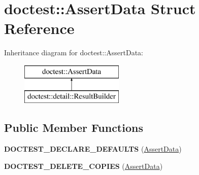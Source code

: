 \hypertarget{structdoctest_1_1_assert_data}{}\section{doctest\+::Assert\+Data Struct Reference}
\label{structdoctest_1_1_assert_data}
Inheritance diagram for doctest\+::Assert\+Data\+:\begin{figure}[H]
\begin{center}
\leavevmode
\includegraphics[height=2.000000cm]{structdoctest_1_1_assert_data}
\end{center}
\end{figure}
\subsection*{Public Member Functions}
\begin{DoxyCompactItemize}
\item 
\mbox{\label{structdoctest_1_1_assert_data_a8543eb3e9ac1c5c10b1becd8bfd0c2fa}} 
{\bfseries D\+O\+C\+T\+E\+S\+T\+\_\+\+D\+E\+C\+L\+A\+R\+E\+\_\+\+D\+E\+F\+A\+U\+L\+TS} (\mbox{\hyperlink{structdoctest_1_1_assert_data}{Assert\+Data}})
\item 
\mbox{\label{structdoctest_1_1_assert_data_a3b8cff970a4c32192510ddc9e6dc97af}} 
{\bfseries D\+O\+C\+T\+E\+S\+T\+\_\+\+D\+E\+L\+E\+T\+E\+\_\+\+C\+O\+P\+I\+ES} (\mbox{\hyperlink{structdoctest_1_1_assert_data}{Assert\+Data}})
\end{DoxyCompactItemize}
